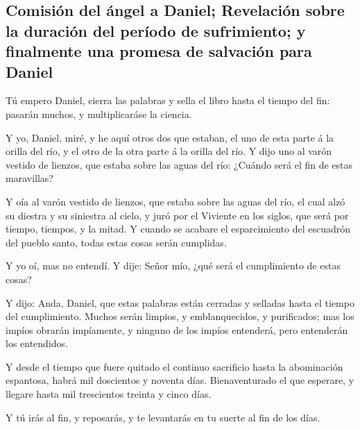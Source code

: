 \hypertarget{comisiuxf3n-del-uxe1ngel-a-daniel-revelaciuxf3n-sobre-la-duraciuxf3n-del-peruxedodo-de-sufrimiento-y-finalmente-una-promesa-de-salvaciuxf3n-para-daniel}{%
\subsection{Comisión del ángel a Daniel; Revelación sobre la duración
del período de sufrimiento; y finalmente una promesa de salvación para
Daniel}\label{comisiuxf3n-del-uxe1ngel-a-daniel-revelaciuxf3n-sobre-la-duraciuxf3n-del-peruxedodo-de-sufrimiento-y-finalmente-una-promesa-de-salvaciuxf3n-para-daniel}}

 Tú empero Daniel, cierra las palabras y sella el libro
hasta el tiempo del fin: pasarán muchos, y multiplicaráse la ciencia.

 Y yo, Daniel, miré, y he aquí otros dos que estaban, el uno
de esta parte á la orilla del río, y el otro de la otra parte á la
orilla del río.  Y dijo uno al varón vestido de lienzos, que
estaba sobre las aguas del río: ¿Cuándo será el fin de estas maravillas?

 Y oía al varón vestido de lienzos, que estaba sobre las
aguas del río, el cual alzó su diestra y su siniestra al cielo, y juró
por el Viviente en los siglos, que será por tiempo, tiempos, y la mitad.
Y cuando se acabare el esparcimiento del escuadrón del pueblo santo,
todas estas cosas serán cumplidas.

 Y yo oí, mas no entendí. Y dije: Señor mío, ¿qué será el
cumplimiento de estas cosas?

 Y dijo: Anda, Daniel, que estas palabras están cerradas y
selladas hasta el tiempo del cumplimiento.  Muchos serán
limpios, y emblanquecidos, y purificados; mas los impíos obrarán
impíamente, y ninguno de los impíos entenderá, pero entenderán los
entendidos.

 Y desde el tiempo que fuere quitado el continuo sacrificio
hasta la abominación espantosa, habrá mil doscientos y noventa días.
 Bienaventurado el que esperare, y llegare hasta mil
trescientos treinta y cinco días.

 Y tú irás al fin, y reposarás, y te levantarás en tu
suerte al fin de los días.
